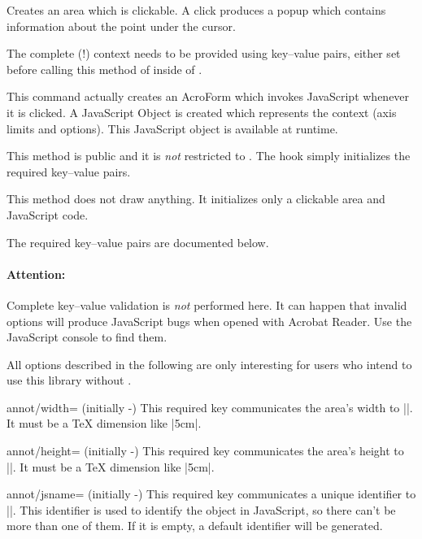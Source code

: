 \begin{command}{\pgfplotsclickablecreate{}}
    Creates an area which is clickable. A click produces a popup which contains
    information about the point under the cursor.

    The complete (!) context needs to be provided using key--value pairs, either
    set before calling this method of inside of
    .

    This command actually creates an AcroForm which invokes JavaScript whenever
    it is clicked. A JavaScript Object is created which represents the context
    (axis limits and options). This JavaScript object is available at runtime.

    This method is public and it is \emph{not} restricted to \PGFPlots{}. The
    \PGFPlots{} hook simply initializes the required key--value pairs.

    This method does not draw anything. It initializes only a clickable area
    and JavaScript code.

    The required key--value pairs are documented below.

    \paragraph{Attention:}

    Complete key--value validation is \emph{not} performed here. It can happen
    that invalid options will produce JavaScript bugs when opened with Acrobat
    Reader. Use the JavaScript console to find them.
\end{command}

\noindent All options described in the following are only interesting for users
who intend to use this library without \PGFPlots{}.

\begin{pgfplotskey}{annot/width= (initially -)}
    This required key communicates the area's width to
    |\pgfplotsclickablecreate|. It must be a \TeX{} dimension like |5cm|.
\end{pgfplotskey}

\begin{pgfplotskey}{annot/height= (initially -)}
    This required key communicates the area's height to
    |\pgfplotsclickablecreate|. It must be a \TeX{} dimension like |5cm|.
\end{pgfplotskey}

\begin{pgfplotskey}{annot/jsname= (initially -)}
    This required key communicates a unique identifier to
    |\pgfplotsclickablecreate|. This identifier is used to identify the object
    in JavaScript, so there can't be more than one of them. If it is empty, a
    default identifier will be generated.
\end{pgfplotskey}


